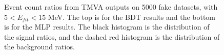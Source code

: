 \begin{figure}[htbp]
	\centering
	\caption[Event count ratios from TMVA outputs on 5000 fake datasets.]{Event count ratios from TMVA outputs on 5000 fake datasets, with $5<E_{fit}<15$ MeV. The top is for the BDT results and the bottom is for the MLP results. The black histogram is the distribution of the signal ratios, and the dashed red histogram is the distribution of the background ratios.\label{fig:TMVAfractions}}
\end{figure}

